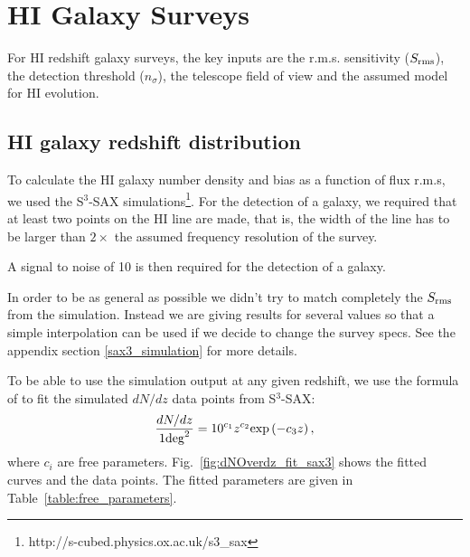 \documentclass[useAMS,usenatbib]{mn2e}
\begin{document}
\section{HI Galaxy Surveys}



For HI redshift galaxy surveys, the key inputs are \citep{Abdalla:2009wr}
the r.m.s. sensitivity ($S_{\rm{rms}}$), the detection threshold ($ n_{\sigma}$), the telescope field of view and the assumed model for HI evolution.


\subsection{HI galaxy redshift distribution}



To calculate the HI galaxy number density and bias as a function of flux r.m.s, we used the S$^3$-SAX simulations\footnote{http://s-cubed.physics.ox.ac.uk/s3\_sax}. For the detection of a galaxy, we required that at least two points on the HI line are made, that is, the width of the line has to be larger than $2\times$ the assumed frequency resolution of the survey. 
%

A signal to noise of 10 is then required for the detection of a galaxy.


In order to be as general as possible we didn't try to match completely the $S_{\rm rms}$ from the simulation. Instead we are giving results for several values so that a simple interpolation can be used if we decide to change the survey specs. See the appendix section \ref{sax3_simulation} for more details.



To be able to use the simulation output at any given redshift, we use the  formula of \cite{Obreschkow:2009ha} to fit the simulated $dN/dz$ data points from S$^3$-SAX:
  \begin{equation}
\frac{{ d}N/ {d}z}{{1 \rm deg}^2}= 10^{c_1} z^{c_2} {\rm exp}\left( - c_3 z\right), 
\label{equ: dndz}
\end{equation}
where $c_i$ are free parameters. Fig.~\ref{fig:dNOverdz_fit_sax3} shows the fitted curves and the data points. The fitted parameters are given in Table~\ref{table:free_parameters}.
\end{document}
